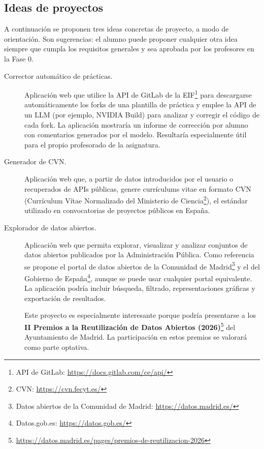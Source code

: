 \subsection{Ideas de proyectos}
\label{sec:practica-2026-05-ltaw:ideas}

A continuación se proponen tres ideas concretas de proyecto, a modo de orientación. Son sugerencias: el alumno puede proponer cualquier otra idea siempre que cumpla los requisitos generales y sea aprobada por los profesores en la Fase 0.

\begin{description}

\item[Corrector automático de prácticas.] Aplicación web que utilice la API de GitLab de la EIF\footnote{API de GitLab: \url{https://docs.gitlab.com/ce/api/}} para descargarse automáticamente los forks de una plantilla de práctica y emplee la API de un LLM (por ejemplo, NVIDIA Build) para analizar y corregir el código de cada fork. La aplicación mostraría un informe de corrección por alumno con comentarios generados por el modelo. Resultaría especialmente útil para el propio profesorado de la asignatura.

\item[Generador de CVN.] Aplicación web que, a partir de datos introducidos por el usuario o recuperados de APIs públicas, genere currículums vitae en formato CVN (Currículum Vítae Normalizado del Ministerio de Ciencia\footnote{CVN: \url{https://cvn.fecyt.es/}}), el estándar utilizado en convocatorias de proyectos públicos en España.

\item[Explorador de datos abiertos.] Aplicación web que permita explorar, visualizar y analizar conjuntos de datos abiertos publicados por la Administración Pública. Como referencia se propone el portal de datos abiertos de la Comunidad de Madrid\footnote{Datos abiertos de la Comunidad de Madrid: \url{https://datos.madrid.es/}} y el del Gobierno de España\footnote{Datos.gob.es: \url{https://datos.gob.es/}}, aunque se puede usar cualquier portal equivalente. La aplicación podría incluir búsqueda, filtrado, representaciones gráficas y exportación de resultados.

  Este proyecto es especialmente interesante porque podría presentarse a los \textbf{II Premios a la Reutilización de Datos Abiertos (2026)}\footnote{\url{https://datos.madrid.es/pages/premios-de-reutilizacion-2026}} del Ayuntamiento de Madrid. La participación en estos premios se valorará como parte optativa.

\end{description}

